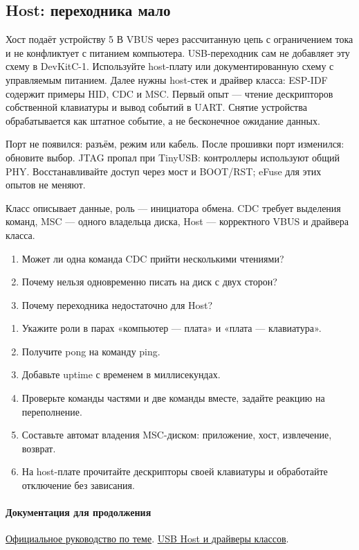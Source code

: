 \subsection{Host: переходника мало}
Хост подаёт устройству 5 В VBUS через рассчитанную цепь с ограничением тока и не конфликтует
с питанием компьютера. USB-переходник сам не добавляет эту схему в DevKitC-1.
Используйте host-плату или документированную схему с управляемым питанием.
Далее нужны host-стек и драйвер класса: ESP-IDF содержит примеры HID, CDC и MSC.
Первый опыт --- чтение дескрипторов собственной клавиатуры и вывод событий в UART.
Снятие устройства обрабатывается как штатное событие, а не бесконечное ожидание данных.

\begin{trouble}
Порт не появился: разъём, режим или кабель. После прошивки порт изменился: обновите выбор.
JTAG пропал при TinyUSB: контроллеры используют общий PHY. Восстанавливайте доступ через
мост и BOOT/RST; eFuse для этих опытов не меняют.
\end{trouble}
\begin{summary}
Класс описывает данные, роль --- инициатора обмена. CDC требует выделения команд,
MSC --- одного владельца диска, Host --- корректного VBUS и драйвера класса.
\end{summary}

\begin{selfcheck}
\begin{enumerate}
\item Может ли одна команда CDC прийти несколькими чтениями?
\item Почему нельзя одновременно писать на диск с двух сторон?
\item Почему переходника недостаточно для Host?
\end{enumerate}
\end{selfcheck}
\begin{tasks}
\begin{enumerate}
\item {} Укажите роли в парах «компьютер — плата» и «плата — клавиатура».
\item {} Получите pong на команду ping.
\item {} Добавьте uptime с временем в миллисекундах.
\item {} Проверьте команды частями и две команды вместе, задайте реакцию на переполнение.
\item {} Составьте автомат владения MSC-диском: приложение, хост, извлечение, возврат.
\item {} На host-плате прочитайте дескрипторы своей клавиатуры и обработайте отключение без зависания.
\end{enumerate}
\end{tasks}

\paragraph{Документация для продолжения}\href{https://docs.espressif.com/projects/esp-idf/en/release-v5.5/esp32s3/api-guides/usb-serial-jtag-console.html}{Официальное руководство по теме}.
\href{https://docs.espressif.com/projects/esp-idf/en/v5.4/esp32s3/api-reference/peripherals/usb_host.html}{USB Host и драйверы классов}.
